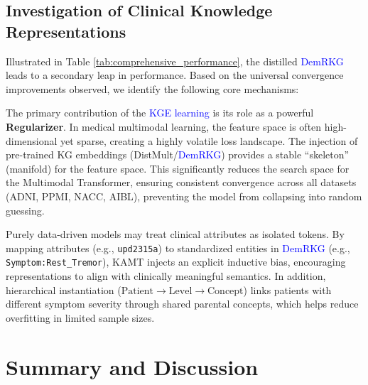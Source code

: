 \documentclass[lettersize,journal]{IEEEtran}
\begin{document}
\subsection{Investigation of Clinical Knowledge Representations}

    Illustrated in Table \ref{tab:comprehensive_performance}, the distilled \textcolor{blue}{DemRKG} leads to a secondary leap in performance. Based on the universal convergence improvements observed, we identify the following core mechanisms:

    
    The primary contribution of the \textcolor{blue}{KGE learning} is its role as a powerful \textbf{Regularizer}. In medical multimodal learning, the feature space is often high-dimensional yet sparse, creating a highly volatile loss landscape. The injection of pre-trained KG embeddings (DistMult/\textcolor{blue}{DemRKG}) provides a stable ``skeleton'' (manifold) for the feature space. This significantly reduces the search space for the Multimodal Transformer, ensuring consistent convergence across all datasets (ADNI, PPMI, NACC, AIBL), preventing the model from collapsing into random guessing.


    Purely data-driven models may treat clinical attributes as isolated tokens. By mapping attributes (e.g., \texttt{upd2315a}) to standardized entities in \textcolor{blue}{DemRKG} (e.g., \texttt{Symptom:Rest\_Tremor}), KAMT injects an explicit inductive bias, encouraging representations to align with clinically meaningful semantics. In addition, hierarchical instantiation ($\text{Patient} \to \text{Level} \to \text{Concept}$) links patients with different symptom severity through shared parental concepts, which helps reduce overfitting in limited sample sizes.

\section{Summary and Discussion}

\end{document}
